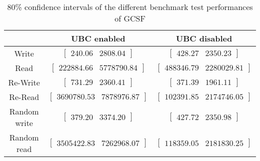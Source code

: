 
	\begin{table}
	\caption{80\% confidence intervals of the different benchmark test performances of GCSF}
	\begin{tabular}{| c | c | c |}
	\hline
	{} & \textbf{UBC enabled} & \textbf{UBC disabled} \\
	\hline
	\hline
	Write &$\left[ \begin{array}{rr} 240.06 & 2808.04 \end{array}\right] $ &$\left[ \begin{array}{rr} 428.27 & 2350.23 \end{array}\right] $\\ 
Read &$\left[ \begin{array}{rr} 222884.66 & 5778790.84 \end{array}\right] $ &$\left[ \begin{array}{rr} 488346.79 & 2280029.81 \end{array}\right] $\\ 
Re-Write &$\left[ \begin{array}{rr} 731.29 & 2360.41 \end{array}\right] $ &$\left[ \begin{array}{rr} 371.39 & 1961.11 \end{array}\right] $\\ 
Re-Read &$\left[ \begin{array}{rr} 3690780.53 & 7878976.87 \end{array}\right] $ &$\left[ \begin{array}{rr} 102391.85 & 2174746.05 \end{array}\right] $\\ 
Random write &$\left[ \begin{array}{rr} 379.20 & 3374.20 \end{array}\right] $ &$\left[ \begin{array}{rr} 427.72 & 2350.98 \end{array}\right] $\\ 
Random read &$\left[ \begin{array}{rr} 3505422.83 & 7262968.07 \end{array}\right] $ &$\left[ \begin{array}{rr} 118359.05 & 2181830.25 \end{array}\right] $\\ 

		\hline
		\end{tabular}
		\label{tbl:bootstrap-table-gcsf}
		\end{table}
	